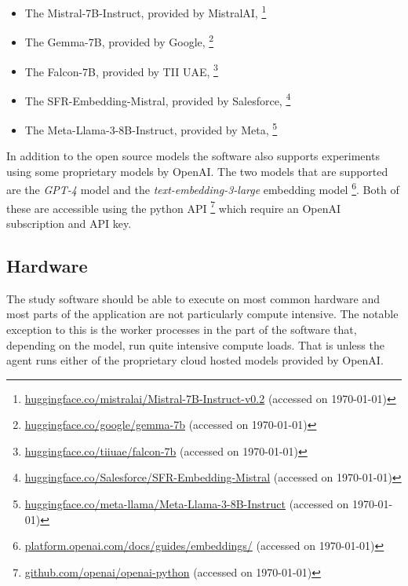 \begin{itemize}
        \item The Mistral-7B-Instruct, provided by MistralAI, \footnote{\href{https://huggingface.co/mistralai/Mistral-7B-Instruct-v0.2}{huggingface.co/mistralai/Mistral-7B-Instruct-v0.2} (accessed on \today)}
        \item The Gemma-7B, provided by Google, \footnote{\href{https://huggingface.co/google/gemma-7b}{huggingface.co/google/gemma-7b} (accessed on \today)}
        \item The Falcon-7B, provided by TII UAE, \footnote{\href{https://huggingface.co/tiiuae/falcon-7b}{huggingface.co/tiiuae/falcon-7b} (accessed on \today)}
        \item The SFR-Embedding-Mistral, provided by Salesforce, \footnote{\href{https://huggingface.co/Salesforce/SFR-Embedding-Mistral}{huggingface.co/Salesforce/SFR-Embedding-Mistral} (accessed on \today)}
        \item The Meta-Llama-3-8B-Instruct, provided by Meta, \footnote{\href{https://huggingface.co/meta-llama/Meta-Llama-3-8B-Instruct}{huggingface.co/meta-llama/Meta-Llama-3-8B-Instruct} (accessed on \today)}
\end{itemize}


In addition to the open source models the software also supports experiments using some proprietary models by OpenAI. The two models that are supported are the \textit{GPT-4} model and the \textit{text-embedding-3-large} embedding model \footnote{\href{https://platform.openai.com/docs/guides/embeddings}{platform.openai.com/docs/guides/embeddings/} (accessed on \today)}. Both of these are accessible using the python API \footnote{\href{https://github.com/openai/openai-python}{github.com/openai/openai-python} (accessed on \today)} which require an OpenAI subscription and API key.


\subsection{Hardware}


The study software should be able to execute on most common hardware and most parts of the application are not particularly compute intensive. The notable exception to this is the worker processes in the  part of the software that, depending on the model, run quite intensive compute loads. That is unless the agent runs either of the proprietary cloud hosted models provided by OpenAI.


